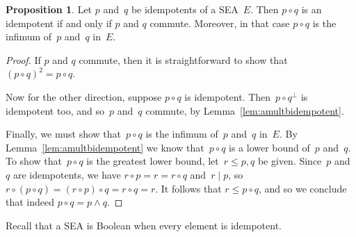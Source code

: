 \documentclass[a4paper, onecolumn, accepted=2020-12-22]{quantumarticle}
\newcommand{\mult}{\mathop{\circ}}
\newcommand{\commu}{\mathrel{\lvert}}
\newcommand{\TODO}[1]{\textcolor{blue}{\emph{[ #1 ]}}}
\newcounter{counter}
\theoremstyle{definition}
\newtheorem{proposition}[counter]{Proposition}
\begin{document}
% 


\begin{proposition}
    Let $p$ and~$q$ be idempotents of a SEA~$E$. Then $p\mult q$ is an idempotent if and only if $p$ and $q$ commute.
    Moreover,
    in that case $p\mult q$ is the infimum of~$p$ and~$q$ in~$E$.
\end{proposition}
\begin{proof}
    If $p$ and $q$ commute, then it is straightforward to show that $(p\mult q)^2 = p\mult q$.

Now for the other direction, suppose $p\mult q$ is idempotent.
Then~$p\mult q^\perp $ is idempotent too,
and so~$p$ and~$q$ commute, by Lemma~\ref{lem:amultbidempotent}.

Finally, we must show that~$p\mult q$ is the infimum of~$p$ and~$q$ in~$E$.
By Lemma~\ref{lem:amultbidempotent}
we know that~$p \mult q$ is a lower bound of~$p$ and~$q$.
To show that~$p\mult q$ is the greatest lower bound,
let~$r\leq p,q$ be given.
Since~$p$ and~$q$ are idempotents,
we have $r\mult p = r = r\mult q$
and~$r\commu p$,
    so $r\mult(p\mult q) = (r\mult p)\mult q
    = r\mult q = r$.
    It follows that $r\leq p\mult q$, and so we conclude that indeed 
    $p\mult q = p\wedge q$.
\end{proof}

Recall that a SEA is Boolean when every element is idempotent.
\end{document}
